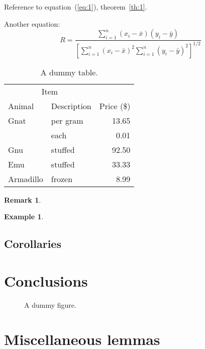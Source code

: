 \documentclass{etna}
\newtheorem{remark}[theorem]{Remark}
\newtheorem{example}[theorem]{Example}
\begin{document}
Reference to equation~(\ref{eq:1}), theorem~\ref{th:1}.

Another equation:
\begin{equation}
  R = \frac{\displaystyle{\sum_{i=1}^n (x_i-\bar{x})(y_i-
\bar{y})}}{\displaystyle{\left[
\sum_{i=1}^n(x_i-\bar{x})^2
\sum_{i=1}^n(y_i-\bar{y})^2\right]^{1/2}}}
\end{equation}

\begin{table}
\centering
\caption{A dummy table.}
\begin{tabular}{llr}
\toprule
\multicolumn{2}{c}{Item} \\
\cmidrule(r){1-2}
Animal    & Description & Price (\$) \\
\midrule
Gnat      & per gram    & 13.65      \\
          & each        & 0.01       \\
Gnu       & stuffed     & 92.50      \\
Emu       & stuffed     & 33.33      \\
Armadillo & frozen      & 8.99       \\
\bottomrule
\end{tabular}
\end{table}

\begin{remark}\upshape
  \lipsum[4]
\end{remark}
\begin{example}
  \lipsum[5]
\end{example}
\subsection{Corollaries}
\begin{corollary}
  \lipsum[6]
\end{corollary}
\begin{lemma}
  \lipsum[27]
\end{lemma}

\section{Conclusions}
\lipsum[10-12]

\begin{figure}
  \caption{A dummy figure.}
\end{figure}

\appendix

\section{Miscellaneous lemmas}
\lipsum[13-15]



\end{document}
